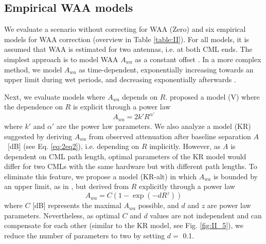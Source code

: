 \documentclass{ctuthesis}\usepackage[]{graphicx}\usepackage[]{color}
\begin{document}
\subsection{Empirical WAA models} \label{paperIIMethB}

We evaluate a scenario without correcting for WAA (Zero) and six empirical models for WAA correction (overview in Table \ref{table:II}). For all models, it is assumed that WAA is estimated for two antennas, i.e. at both CML ends. The simplest approach is to model WAA $A_{wa}$ as a constant offset \citep[O; ][]{overeemMeasuringUrbanRainfall2011}. In a more complex method, we model $A_{wa}$ as time-dependent, exponentially increasing towards an upper limit during wet periods, and decreasing exponentially afterwards \citep[S; ][]{schleissQuantificationModelingWetAntenna2013}. 

Next, we evaluate models where $A_{wa}$ depends on $R$.  \cite{valtrExcessAttenuationCaused2019} proposed a model (V) where the dependence on $R$ is explicit through a power law
        \begin{equation} \label{eq:II_1}
        A_{wa} = 2 k' R^{\alpha'}
        \end{equation}
where $k'$ and $\alpha'$ are the power law parameters. We also analyze a model (KR) suggested by \cite{kharadlyEffectWetAntenna2001} deriving $A_{wa}$ from observed attenuation after baseline separation $A$~[dB] (see Eq. \ref{eq:2eq2}), i.e. depending on $R$ implicitly. However, as $A$ is dependent on CML path length, optimal parameters of the KR model would differ for two CMLs with the same hardware but with different path lengths. To eliminate this feature, we propose a model (KR-alt) in which $A_{wa}$ is bounded by an upper limit, as in \cite{kharadlyEffectWetAntenna2001}, but derived from $R$ explicitly through a power law
        \begin{equation} \label{eq:II_2}
        A_{wa} = C ( 1 - \exp(-d R^z)  )
        \end{equation}
where $C$ [dB] represents the maximal $A_{wa}$ possible, and $d$ and $z$ are power law parameters. Nevertheless, as optimal $C$ and $d$ values are not independent and can compensate for each other (similar to the KR model, see Fig. \ref{fig:II_5}), we reduce the number of parameters to two by setting $d =$ 0.1.
\end{document}
